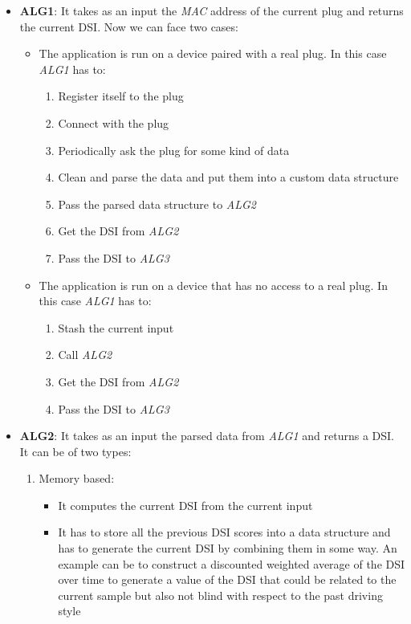 \begin{itemize}
	\item \textbf{ALG1}: It takes as an input the \textit{MAC} address of the current plug and returns the current DSI. Now we can face two cases:
	\begin{itemize}
		\item The application is run on a device paired with a real plug. In this case \textit{ALG1} has to:
		\begin{enumerate}
			\item Register itself to the plug
			\item Connect with the plug
			\item Periodically ask the plug for some kind of data
			\item Clean and parse the data and put them into a custom data structure
			\item Pass the parsed data structure to \textit{ALG2}
			\item Get the DSI from \textit{ALG2}
			\item Pass the DSI to \textit{ALG3}
		\end{enumerate}
		\item The application is run on a device that has no access to a real plug. In this case \textit{ALG1} has to:
		\begin{enumerate}
			\item Stash the current input
			\item Call \textit{ALG2}
			\item Get the DSI from \textit{ALG2}
			\item Pass the DSI to \textit{ALG3}
		\end{enumerate}
	\end{itemize}
	\item \textbf{ALG2}: It takes as an input the parsed data from \textit{ALG1} and returns a DSI. It can be of two types:
	\begin{enumerate}
		\item Memory based:
		\begin{itemize}
			\item It computes the current DSI from the current input
			\item It has to store all the previous DSI scores into a data structure and has to generate the current DSI by combining them in some way. An example can be to construct a discounted weighted average of the DSI over time to generate a value of the DSI that could be related to the current sample but also not blind with respect to the past driving style

\end{itemize}
\end{enumerate}
\end{itemize}
